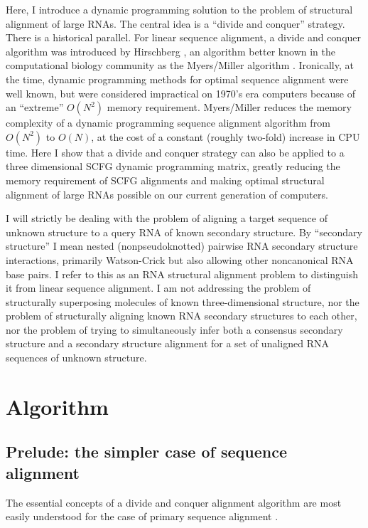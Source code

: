\documentclass[11pt]{article}
\begin{document}
Here, I introduce a dynamic programming solution to the problem of
structural alignment of large RNAs. The central idea is a ``divide and
conquer'' strategy. There is a historical parallel.  For linear
sequence alignment, a divide and conquer algorithm was introduced by
Hirschberg \cite{Hirschberg75}, an algorithm better known in the
computational biology community as the Myers/Miller algorithm
\cite{MyM-88a}.  Ironically, at the time, dynamic programming methods
for optimal sequence alignment were well known, but were considered
impractical on 1970's era computers because of an ``extreme'' $O(N^2)$
memory requirement. Myers/Miller reduces the memory complexity of a
dynamic programming sequence alignment algorithm from $O(N^2)$ to
$O(N)$, at the cost of a constant (roughly two-fold) increase in CPU
time. Here I show that a divide and conquer strategy can also be
applied to a three dimensional SCFG dynamic programming matrix,
greatly reducing the memory requirement of SCFG alignments and making
optimal structural alignment of large RNAs possible on our current
generation of computers.

I will strictly be dealing with the problem of aligning a target
sequence of unknown structure to a query RNA of known secondary
structure. By ``secondary structure'' I mean nested (nonpseudoknotted)
pairwise RNA secondary structure interactions, primarily Watson-Crick
but also allowing other noncanonical RNA base pairs. I refer to this
as an RNA structural alignment problem to distinguish it from linear
sequence alignment. I am not addressing the problem of structurally
superposing molecules of known three-dimensional structure, nor the
problem of structurally aligning known RNA secondary structures to
each other, nor the problem of trying to simultaneously infer both a
consensus secondary structure and a secondary structure alignment for
a set of unaligned RNA sequences of unknown structure.

\section{Algorithm}

\subsection{Prelude: the simpler case of sequence alignment}

The essential concepts of a divide and conquer alignment algorithm are
most easily understood for the case of primary sequence alignment
\cite{Hirschberg75,MyM-88a}. 
\end{document}
